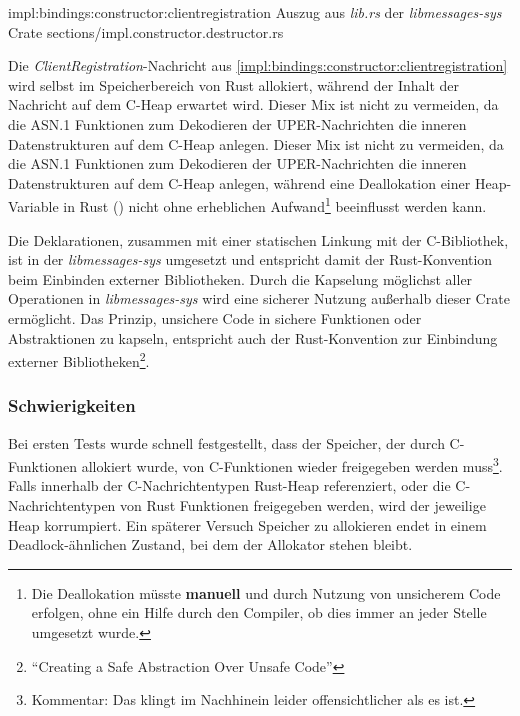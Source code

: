\rustcinclude
	{impl:bindings:constructor:clientregistration}
	{Auszug aus \textit{lib.rs} der \textit{libmessages-sys} Crate}
	{sections/impl.constructor.destructor.rs}
	
Die \textit{ClientRegistration}-Nachricht aus \autoref{impl:bindings:constructor:clientregistration} wird selbst im Speicherbereich von Rust allokiert, während der Inhalt der Nachricht auf dem C-Heap erwartet wird.
Dieser Mix ist nicht zu vermeiden, da die ASN.1 Funktionen zum Dekodieren der UPER-Nachrichten die inneren Datenstrukturen auf dem C-Heap anlegen.
Dieser Mix ist nicht zu vermeiden, da die ASN.1 Funktionen zum Dekodieren der UPER-Nachrichten die inneren Datenstrukturen auf dem C-Heap anlegen, während eine Deallokation einer Heap-Variable in Rust () nicht ohne erheblichen Aufwand\footnote{Die Deallokation müsste \textbf{manuell} und durch Nutzung von unsicherem Code erfolgen, ohne ein Hilfe durch den Compiler, ob dies immer an jeder Stelle umgesetzt wurde.} beeinflusst werden kann.

Die Deklarationen, zusammen mit einer statischen Linkung mit der C-Bibliothek, ist in der \textit{libmessages-sys} umgesetzt und entspricht damit der Rust-Konvention beim Einbinden externer Bibliotheken\cite{rust:cargo:build_scripts}.
Durch die Kapselung möglichst aller  Operationen in \textit{libmessages-sys} wird eine sicherer Nutzung außerhalb dieser Crate ermöglicht.
Das Prinzip, unsichere Code in sichere Funktionen oder Abstraktionen zu kapseln, entspricht auch der Rust-Konvention zur Einbindung externer Bibliotheken\footnote{\enquote{Creating a Safe Abstraction Over Unsafe Code}}\cite{rust:book:unsafe}.



\subsubsection{Schwierigkeiten}

Bei ersten Tests wurde schnell festgestellt, dass der Speicher, der durch C-Funktionen allokiert wurde, von C-Funktionen wieder freigegeben werden muss\footnote{Kommentar: Das klingt im Nachhinein leider offensichtlicher als es ist.}.
Falls innerhalb der C-Nachrichtentypen Rust-Heap referenziert, oder die C-Nachrichtentypen von Rust Funktionen freigegeben werden, wird der jeweilige Heap korrumpiert.
Ein späterer Versuch Speicher zu allokieren endet in einem Deadlock-ähnlichen Zustand, bei dem der Allokator stehen bleibt.

